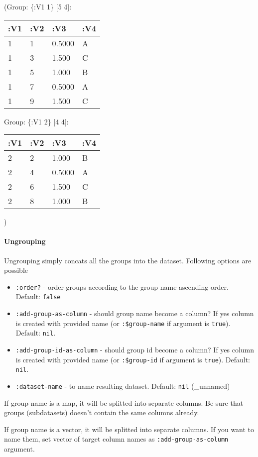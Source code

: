 \documentclass[]{article}
\providecommand{\tightlist}{%
  \setlength{\itemsep}{0pt}\setlength{\parskip}{0pt}}
\let\oldparagraph\paragraph
\renewcommand{\paragraph}[1]{\oldparagraph{#1}\mbox{}}
\begin{document}
(Group: \{:V1 1\} {[}5 4{]}:

\begin{longtable}[]{@{}llll@{}}
\toprule
:V1 & :V2 & :V3 & :V4\tabularnewline
\midrule
\endhead
1 & 1 & 0.5000 & A\tabularnewline
1 & 3 & 1.500 & C\tabularnewline
1 & 5 & 1.000 & B\tabularnewline
1 & 7 & 0.5000 & A\tabularnewline
1 & 9 & 1.500 & C\tabularnewline
\bottomrule
\end{longtable}

Group: \{:V1 2\} {[}4 4{]}:

\begin{longtable}[]{@{}llll@{}}
\toprule
:V1 & :V2 & :V3 & :V4\tabularnewline
\midrule
\endhead
2 & 2 & 1.000 & B\tabularnewline
2 & 4 & 0.5000 & A\tabularnewline
2 & 6 & 1.500 & C\tabularnewline
2 & 8 & 1.000 & B\tabularnewline
\bottomrule
\end{longtable}

)

\paragraph{Ungrouping}\label{ungrouping}

Ungrouping simply concats all the groups into the dataset. Following
options are possible

\begin{itemize}
\tightlist
\item
  \texttt{:order?} - order groups according to the group name ascending
  order. Default: \texttt{false}
\item
  \texttt{:add-group-as-column} - should group name become a column? If
  yes column is created with provided name (or \texttt{:\$group-name} if
  argument is \texttt{true}). Default: \texttt{nil}.
\item
  \texttt{:add-group-id-as-column} - should group id become a column? If
  yes column is created with provided name (or \texttt{:\$group-id} if
  argument is \texttt{true}). Default: \texttt{nil}.
\item
  \texttt{:dataset-name} - to name resulting dataset. Default:
  \texttt{nil} (\_unnamed)
\end{itemize}

If group name is a map, it will be splitted into separate columns. Be
sure that groups (subdatasets) doesn't contain the same columns already.

If group name is a vector, it will be splitted into separate columns. If
you want to name them, set vector of target column names as
\texttt{:add-group-as-column} argument.
\end{document}
